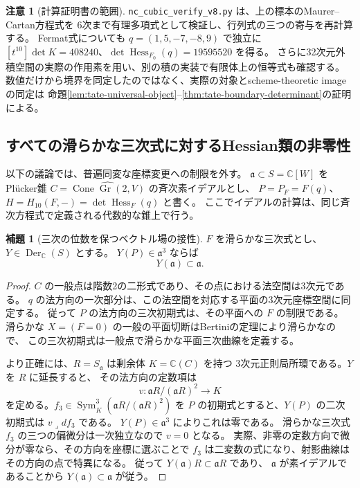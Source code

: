 \documentclass[a4paper,11pt]{ltjsarticle}
\theoremstyle{definition}
\newtheorem{lemma}[theorem]{補題}
\newtheorem{remark}[theorem]{注意}
\newcommand{\CC}{\mathbb C}
\begin{document}
\begin{remark}[計算証明書の範囲]
\texttt{nc\_cubic\_verify\_v8.py} は、上の標本のMaurer--Cartan方程式を
6次まで有理多項式として検証し、行列式の三つの寄与を再計算する。
Fermat式についても $q=(1,5,-7,-8,9)$ で独立に
$[t^{10}]\det K=408240$、$\det\operatorname{Hess}_{F_0}(q)=19595520$ を得る。
さらに32次元外積空間の実際の作用素を用い、別の積の実装で有限体上の恒等式も確認する。
数値だけから境界を同定したのではなく、実際の対象とscheme-theoretic imageの同定は
命題\ref{lem:tate-universal-object}--\ref{thm:tate-boundary-determinant}の証明による。
\end{remark}

\subsection{すべての滑らかな三次式に対するHessian類の非零性}
\label{subsec:all-smooth-hessian}

以下の議論では、普遍同変な座標変更への制限を外す。
$\mathfrak a\subset S=\CC[W]$ をPl\"ucker錐
$C=\widehat{\operatorname{Cone}\operatorname{Gr}(2,V)}$ の斉次素イデアルとし、
$P=P_F=F(q)$、$H=H_{10}(F,-)=\det\operatorname{Hess}_F(q)$ と書く。
ここでイデアルの計算は、同じ斉次方程式で定義される代数的な錐上で行う。

\begin{lemma}[三次の位数を保つベクトル場の接性]
\label{lem:cubic-order-forces-tangency}
$F$ を滑らかな三次式とし、$Y\in\operatorname{Der}_{\CC}(S)$ とする。
$Y(P)\in\mathfrak a^3$ ならば
\[
 Y(\mathfrak a)\subset\mathfrak a.
\]
\end{lemma}
\begin{proof}
$C$ の一般点は階数2の二形式であり、その点における法空間は3次元である。
$q$ の法方向の一次部分は、この法空間を対応する平面の3次元座標空間に同定する。
従って $P$ の法方向の三次初期式は、その平面への $F$ の制限である。
滑らかな $X=(F=0)$ の一般の平面切断はBertiniの定理により滑らかなので、
この三次初期式は一般点で滑らかな平面三次曲線を定義する。

より正確には、$R=S_{\mathfrak a}$ は剰余体 $K=\CC(C)$ を持つ
3次元正則局所環である。$Y$ を $R$ に延長すると、
その法方向の定数項は
\[
 v\colon\mathfrak aR/(\mathfrak aR)^2\longrightarrow K
\]
を定める。$f_3\in\operatorname{Sym}^3_K(\mathfrak aR/(\mathfrak aR)^2)$
を $P$ の初期式とすると、$Y(P)$ の二次初期式は $v\lrcorner df_3$ である。
$Y(P)\in\mathfrak a^3$ によりこれは零である。
滑らかな三次式 $f_3$ の三つの偏微分は一次独立なので $v=0$ となる。
実際、非零の定数方向で微分が零なら、その方向を座標に選ぶことで
$f_3$ は二変数の式になり、射影曲線はその方向の点で特異になる。
従って $Y(\mathfrak a)R\subset\mathfrak aR$ であり、
$\mathfrak a$ が素イデアルであることから $Y(\mathfrak a)\subset\mathfrak a$ が従う。
\end{proof}
\end{document}
